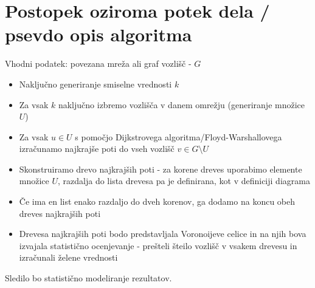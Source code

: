 \documentclass[a4paper, 12pt]{article}
\begin{document}
\section{Postopek oziroma potek dela / psevdo opis algoritma}
Vhodni podatek: povezana mreža ali graf vozlišč - $G$
\begin{itemize}
\item Naključno generiranje smiselne vrednosti $k$ 
\item Za vsak $k$ naključno izbremo vozlišča v danem omrežju (generiranje množice $U$)
\item Za vsak $u \in U$ s pomočjo Dijkstrovega algoritma/Floyd-Warshallovega izračunamo najkrajše poti do vseh vozlišč $v \in G \setminus U$
\item Skonstruiramo drevo najkrajših poti - za korene dreves uporabimo elemente množice $U$, razdalja do lista drevesa pa je definirana, kot v definiciji diagrama
\item Če ima en list enako razdaljo do dveh korenov, ga dodamo na koncu obeh dreves najkrajših poti
\item Drevesa najkrajših poti bodo predstavljala Voronoijeve celice in na njih bova izvajala statistično ocenjevanje - prešteli šteilo vozlišč v vsakem drevesu in izračunali želene vrednosti
\end{itemize}
Sledilo bo statistično modeliranje rezultatov.
\end{document}
